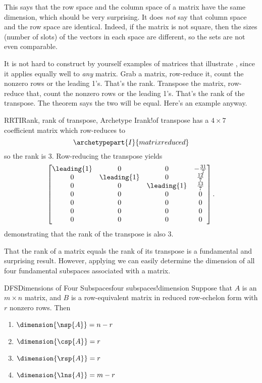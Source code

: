 %
This says that the row space and the column space of a matrix have the same dimension, which should be very surprising.  It does {\em not} say that column space and the row space are identical.  Indeed, if the matrix is not square, then the sizes (number of slots) of the vectors in each space are different, so the sets are not even comparable.\par
%
It is not hard to construct by yourself examples of matrices that illustrate , since it applies equally well to {\em any} matrix.  Grab a matrix, row-reduce it, count the nonzero rows or the leading 1's.  That's the rank.  Transpose the matrix, row-reduce that, count the nonzero rows or the leading 1's.  That's the rank of the transpose.  The theorem says the two will be equal.  Here's an example anyway.
%
\begin{example}{RRTI}{Rank, rank of transpose, Archetype I}{rank!of transpose}
 has a $4\times 7$ coefficient matrix which row-reduces to
%
\begin{equation*}
\archetypepart{I}{matrixreduced}
\end{equation*}
%
so the rank is $3$.  Row-reducing the transpose yields
%
\begin{equation*}
\begin{bmatrix}
\leading{1} & 0 & 0 & -\frac{31}{7}\\ 
0 & \leading{1} & 0 & \frac{12}{7}\\ 
0 & 0 & \leading{1} & \frac{13}{7}\\ 
0 & 0 & 0 & 0\\ 
0 & 0 & 0 & 0\\ 
0 & 0 & 0 & 0\\ 
0 & 0 & 0 & 0
\end{bmatrix}.
\end{equation*}
%
demonstrating that the rank of the transpose is also $3$.
%
\end{example}
%
%
That the rank of a matrix equals the rank of its transpose is a fundamental and surprising result.  However, applying  we can easily determine the dimension of all four fundamental subspaces associated with a matrix.
%
\begin{theorem}{DFS}{Dimensions of Four Subspaces}{four subspaces!dimension}
Suppose that $A$ is an $m\times n$ matrix, and $B$ is a row-equivalent matrix in reduced row-echelon form with $r$ nonzero rows.  Then
\begin{enumerate}
\item $\dimension{\nsp{A}}=n-r$
\item $\dimension{\csp{A}}=r$
\item $\dimension{\rsp{A}}=r$
\item $\dimension{\lns{A}}=m-r$
\end{enumerate}
\end{theorem}
